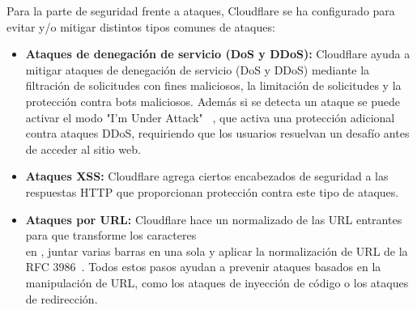 Para la parte de seguridad frente a ataques, Cloudflare se ha configurado para evitar y/o mitigar distintos tipos comunes de ataques:
\begin{itemize}
    \item \textbf{Ataques de denegación de servicio (DoS y DDoS):} Cloudflare ayuda a mitigar ataques de denegación de servicio (DoS y DDoS) mediante la filtración de solicitudes con fines maliciosos, la limitación de solicitudes y la protección contra bots maliciosos. Además si se detecta un ataque se puede activar el modo "I'm Under Attack" ~\cite{CloudflareTeam2025}, que activa una protección adicional contra ataques DDoS, requiriendo que los usuarios resuelvan un desafío antes de acceder al sitio web.
    
    \item \textbf{Ataques XSS:} Cloudflare agrega ciertos encabezados de seguridad a las respuestas HTTP que proporcionan protección contra este tipo de ataques.

    \item \textbf{Ataques por URL:} Cloudflare hace un normalizado de las URL entrantes para que transforme los caracteres \\ en \/, juntar varias barras en una sola y aplicar la normalización de URL de la RFC 3986~\cite{CloudflareTeam2024}.    
    Todos estos pasos ayudan a prevenir ataques basados en la manipulación de URL, como los ataques de inyección de código o los ataques de redirección.
\end{itemize}

